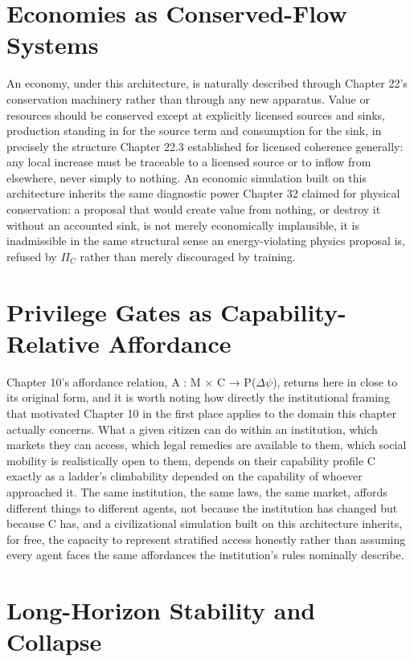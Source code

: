 \section{Economies as Conserved-Flow Systems}

An economy, under this architecture, is naturally described through Chapter 22's conservation machinery rather than through any new apparatus. Value or resources should be conserved except at explicitly licensed sources and sinks, production standing in for the source term and consumption for the sink, in precisely the structure Chapter 22.3 established for licensed coherence generally: any local increase must be traceable to a licensed source or to inflow from elsewhere, never simply to nothing. An economic simulation built on this architecture inherits the same diagnostic power Chapter 32 claimed for physical conservation: a proposal that would create value from nothing, or destroy it without an accounted sink, is not merely economically implausible, it is inadmissible in the same structural sense an energy-violating physics proposal is, refused by \(\Pi_C\) rather than merely discouraged by training.

\section{Privilege Gates as Capability-Relative Affordance}

Chapter 10's affordance relation, A : M × C → P(\(\Delta\psi\)), returns here in close to its original form, and it is worth noting how directly the institutional framing that motivated Chapter 10 in the first place applies to the domain this chapter actually concerns. What a given citizen can do within an institution, which markets they can access, which legal remedies are available to them, which social mobility is realistically open to them, depends on their capability profile C exactly as a ladder's climbability depended on the capability of whoever approached it. The same institution, the same laws, the same market, affords different things to different agents, not because the institution has changed but because C has, and a civilizational simulation built on this architecture inherits, for free, the capacity to represent stratified access honestly rather than assuming every agent faces the same affordances the institution's rules nominally describe.

\section{Long-Horizon Stability and Collapse}


